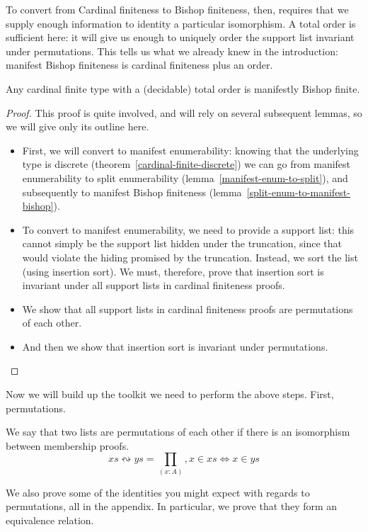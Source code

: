 To convert from Cardinal finiteness to Bishop finiteness, then, requires that we
supply enough information to identity a particular isomorphism.
A total order is sufficient here: it will give us enough to uniquely order the
support list invariant under permutations.
This tells us what we already knew in the introduction: manifest Bishop
finiteness is cardinal finiteness plus an order.

\begin{theorem}
  Any cardinal finite type with a (decidable) total order is manifestly Bishop
  finite.
\end{theorem}
\begin{proof}
  This proof is quite involved, and will rely on several subsequent lemmas, so
  we will give only its outline here.
  \begin{itemize}
    \item First, we will convert to manifest enumerability: knowing that the
      underlying type is discrete (theorem~\ref{cardinal-finite-discrete}) we can
      go from manifest enumerability to split enumerability
      (lemma~\ref{manifest-enum-to-split}), and subsequently to manifest Bishop
      finiteness (lemma~\ref{split-enum-to-manifest-bishop}).
    \item To convert to manifest enumerability, we need to provide a support
      list: this cannot simply be the support list hidden under the truncation,
      since that would violate the hiding promised by the truncation.
      Instead, we sort the list (using insertion sort).
      We must, therefore, prove that insertion sort is invariant under all
      support lists in cardinal finiteness proofs.
    \item We show that all support lists in cardinal finiteness proofs are
      permutations of each other.
    \item And then we show that insertion sort is invariant under permutations.
  \end{itemize} 
\end{proof}
Now we will build up the toolkit we need to perform the above steps.
First, permutations.
\begin{definition}
  We say that two lists are permutations of each other if there is an
  isomorphism between membership proofs.
  \begin{equation}
    \mathit{xs} \leftrightsquigarrow \mathit{ys} = \prod_{(x : A)} , x \in \mathit{xs} \iff x \in \mathit{ys}
  \end{equation}
\end{definition}
We also prove some of the identities you might expect with regards to
permutations, all in the appendix.
In particular, we prove that they form an equivalence relation.

